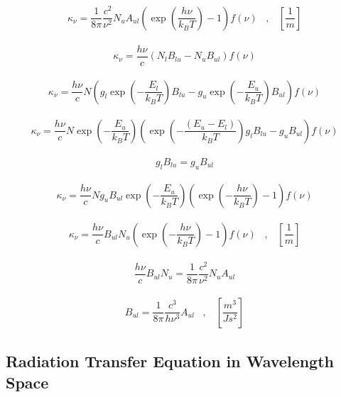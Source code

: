 \begin{align}
\kappa_{\nu} = \dfrac{1}{8 \pi} \dfrac{c^2}{\nu^2} N_u A_{ul} \left(\exp\left(\dfrac{h \nu}{k_B T}\right) - 1\right) f(\nu)  \;\;\; , \;\;\; \left[\dfrac{1}{m}\right]
\end{align}


\begin{align}
\kappa_\nu = \dfrac{h \nu}{c} \left(N_l B_{lu} - N_u B_{ul}\right) f(\nu)
\end{align}

\begin{align} 
\kappa_\nu = \dfrac{h \nu}{c} N \left(g_l \exp\left(-\dfrac{E_l}{k_B T}\right) B_{lu} - g_u\exp\left(-\dfrac{E_u}{k_B T}\right) B_{ul}\right) f(\nu)
\end{align}

\begin{align}
\kappa_\nu = \dfrac{h \nu}{c} N \exp\left(-\dfrac{E_u}{k_B T}\right) \left(\exp\left(-\dfrac{(E_u-E_l)}{k_B T}\right) 
g_l B_{lu} - g_u B_{ul}\right) f(\nu)
\end{align}

\begin{align}
g_l B_{lu} = g_u B_{ul}
\end{align}

\begin{align}
\kappa_\nu = \dfrac{h \nu}{c} N g_u B_{ul} \exp\left(-\dfrac{E_u}{k_B T}\right) 
\left(\exp\left(-\dfrac{h \nu}{k_B T}\right) - 1\right) f(\nu)
\end{align}

\begin{align}
\kappa_\nu = \dfrac{h \nu}{c} B_{ul} N_u \left(\exp\left(-\dfrac{h \nu}{k_B T}\right) - 1\right) f(\nu) \;\;\; , \;\;\; \left[\dfrac{1}{m}\right]
\end{align}

\begin{align}
\dfrac{h \nu}{c} B_{ul} N_u = \dfrac{1}{8 \pi} \dfrac{c^2}{\nu^2} N_u A_{ul}
\end{align}

\begin{align}
B_{ul} = \dfrac{1}{8 \pi} \dfrac{c^3}{h \nu^3} A_{ul} \;\;\; , \;\;\; \left[\dfrac{m^3}{J s^2}\right]
\end{align}


\subsection{Radiation Transfer Equation in Wavelength Space}

